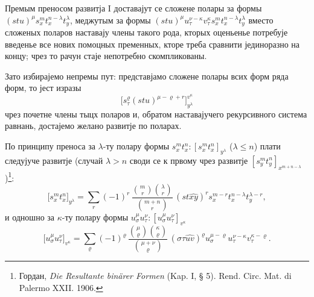 ﻿\documentclass[11pt]{article}
\begin{document}
Премым преносом развитја I доставајут се сложене полары за формы $(stu)^\mu s_x^m t_x^{n-\lambda}t_y^\lambda$, меджутым за формы $(stu)^\mu u_\tau^{\nu-\kappa}v_\tau^\kappa s_x^m t_x^{n-\lambda}t_y^\lambda$ вместо сложеных поларов наставају члены такого рода, кторых оценьенье потребује введенье все нових помоцных пременных, кторе треба сравнити јединоразно на концу; чрез то рачун стаје непотребно скомпликованы.

Зато избирајемо непремы пут: представјамо сложене полары всих форм ряда форм, то јест изразы
\[
\bigl[s_\tau^\varrho(stu)^{\mu-\varrho+r}\bigr]_{y^\lambda}^{v^\kappa}
\]
чрез почетне члены тыцх поларов и, обратом наставајучего рекурсивного система равнань, достајемо желано развитје по поларах.

По принципу преноса за $\lambda$-ту полару формы $s_x^m t_x^n:[s_x^m t_x^n]_{y^\lambda}$ ($\lambda\le n$) плати следујуче развитје (случай $\lambda>n$ своди се к првому чрез развитје $[s_y^m t_y^n]_{x^{m+n-\lambda}}$)\footnote{Гордан, \emph{Die Resultante binärer Formen} (Kap. I, § 5). Rend. Circ. Mat. di Palermo XXII. 1906.}:
\[
\bigl[s_x^m t_x^n\bigr]_{y^\lambda}
=\sum_r (-1)^r\,
\frac{\binom{m}{r}\binom{\lambda}{r}}{\binom{m+n}{r}}\,
(st\widehat{xy})^r s_x^{m-r}t_x^{n-\lambda}t_y^{\lambda-r},
\]
и одношно за $\kappa$-ту полару формы $u_\sigma^\mu u_\tau^\nu:[u_\sigma^\mu u_\tau^\nu]_{v^\kappa}$
\[
\bigl[u_\sigma^\mu u_\tau^\nu\bigr]_{v^\kappa}
=\sum_\varrho (-1)^\varrho\,
\frac{\binom{\mu}{\varrho}\binom{\kappa}{\varrho}}{\binom{\mu+\nu}{\varrho}}\,
(\sigma\tau\widehat{uv})^\varrho u_\sigma^{\mu-\varrho}u_\tau^{\nu-\kappa}v_\tau^{\kappa-\varrho}.
\]
\end{document}
